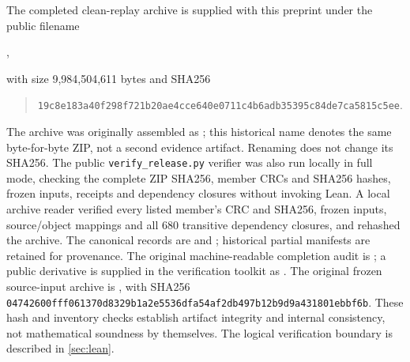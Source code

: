 \documentclass[11pt,a4paper]{article}
\theoremstyle{definition}
\newcommand{\code}[1]{\texttt{#1}}
\begin{document}
The completed clean-replay archive is supplied with this preprint under the public filename
\begin{center}\small{},\end{center}
with size 9,984,504,611 bytes and SHA256
\begin{quote}\small\nolinkurl{19c8e183a40f298f721b20ae4cce640e0711c4b6adb35395c84de7ca5815c5ee}.\end{quote}
The archive was originally assembled as ; this historical name denotes the same byte-for-byte ZIP, not a second evidence artifact. Renaming does not change its SHA256. The public \code{verify\_release.py} verifier was also run locally in full mode, checking the complete ZIP SHA256, member CRCs and SHA256 hashes, frozen inputs, receipts and dependency closures without invoking Lean.
A local archive reader verified every listed member's CRC and SHA256, frozen inputs, source/object mappings and all 680 transitive dependency closures, and rehashed the archive. The canonical records are  and ; historical partial manifests are retained for provenance. The original machine-readable completion audit is ; a public derivative is supplied in the verification toolkit as . The original frozen source-input archive is , with SHA256 \nolinkurl{04742600fff061370d8329b1a2e5536dfa54af2db497b12b9d9a431801ebbf6b}. These hash and inventory checks establish artifact integrity and internal consistency, not mathematical soundness by themselves. The logical verification boundary is described in \cref{sec:lean}.
\end{document}
